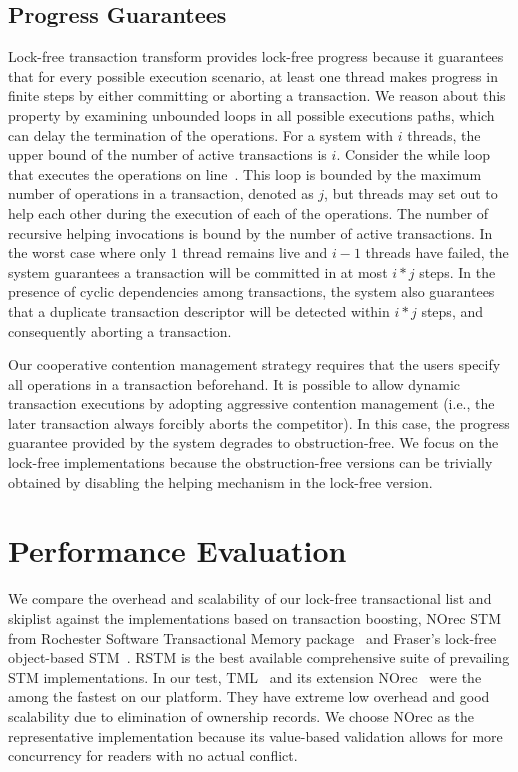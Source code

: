 \documentclass[]{sig-alternate-05-2015}
\begin{document}
\subsection{Progress Guarantees}
Lock-free transaction transform provides lock-free progress because it guarantees that for every possible execution scenario, at least one thread makes progress in finite steps by either committing or aborting a transaction.  
We reason about this property by examining unbounded loops in all possible executions paths, which can delay the termination of the operations.
For a system with $i$ threads, the upper bound of the number of active transactions is $i$.
Consider the while loop that executes the operations on line~.
This loop is bounded by the maximum number of operations in a transaction, denoted as $j$, but threads may set out to help each other during the execution of each of the operations.
The number of recursive helping invocations is bound by the number of active transactions. 
In the worst case where only $1$ thread remains live and $i-1$ threads have failed, the system guarantees a transaction will be committed in at most $i * j$ steps.
In the presence of cyclic dependencies among transactions, the system also guarantees that a duplicate transaction descriptor will be detected within $i * j$ steps, and consequently aborting a transaction.

Our cooperative contention management strategy requires that the users specify all operations in a transaction beforehand.
It is possible to allow dynamic transaction executions by adopting aggressive contention management (i.e., the later transaction always forcibly aborts the competitor).
In this case, the progress guarantee provided by the system degrades to obstruction-free.
We focus on the lock-free implementations because the obstruction-free versions can be trivially obtained by disabling the helping mechanism in the lock-free version.

\section{Performance Evaluation}
\label{sec:experiment}
We compare the overhead and scalability of our lock-free transactional list and skiplist against the implementations based on transaction boosting, NOrec STM from Rochester Software Transactional Memory package~\cite{marathe2006lowering} and Fraser's lock-free object-based STM~\cite{fraser2004practical}.
RSTM is the best available comprehensive suite of prevailing STM implementations.
In our test, TML~\cite{dalessandro2010norec} and its extension NOrec~\cite{dalessandro2010norec} were the among the fastest on our platform.
They have extreme low overhead and good scalability due to elimination of ownership records.
We choose NOrec as the representative implementation because its value-based validation allows for more concurrency for readers with no actual conflict.
\end{document}
